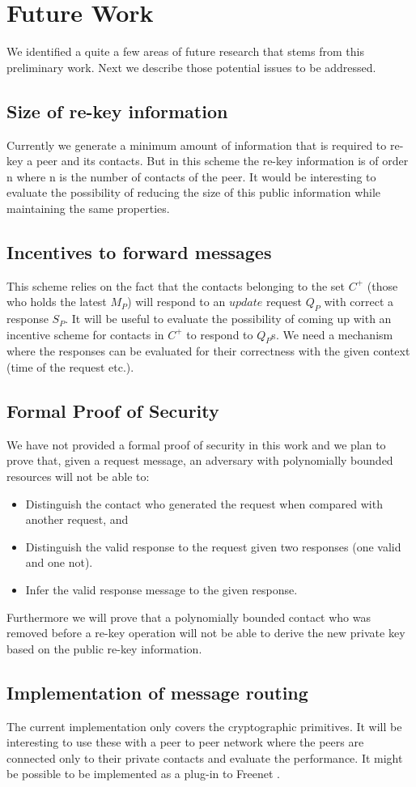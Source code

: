\section{Future Work}

We identified a quite a few areas of future research that stems from this preliminary work. Next we describe those potential issues to be addressed.

\subsection{Size of re-key information}
Currently we generate a minimum amount of information that is required to re-key a peer and its contacts. But in this scheme the re-key information is of order n where n is the number of contacts of the peer. It would be interesting to evaluate the possibility of reducing the size of this public information while maintaining the same properties.

\subsection{Incentives to forward messages}
This scheme relies on the fact that the contacts belonging to the set $C^+$ (those who holds the latest $M_P$) will respond to an $update$ request $Q_P$ with correct a response $S_P$. It will be useful to evaluate the possibility of coming up with an incentive scheme for contacts in $C^+$ to respond to $Q_P$s. We need a mechanism where the responses can be evaluated for their correctness with the given context (time of the request etc.).

\subsection{Formal Proof of Security}
We have not provided a formal proof of security in this work and we plan to prove that, given a request message, an adversary with polynomially bounded resources will not be able to:
\begin{itemize}
\item Distinguish the contact who generated the request when compared with another request, and
\item Distinguish the valid response to the request given two responses (one valid and one not).
\item Infer the valid response message to the given response.
\end{itemize}

Furthermore we will prove that a polynomially bounded contact who was removed before a re-key operation will not be able to derive the new private key based on the public re-key information.

\subsection{Implementation of message routing}
The current implementation only covers the cryptographic primitives. It will be interesting to use these with a peer to peer network where the peers are connected only to their private contacts and evaluate the performance. It might be possible to be implemented as a plug-in to Freenet \cite{freenet}.


